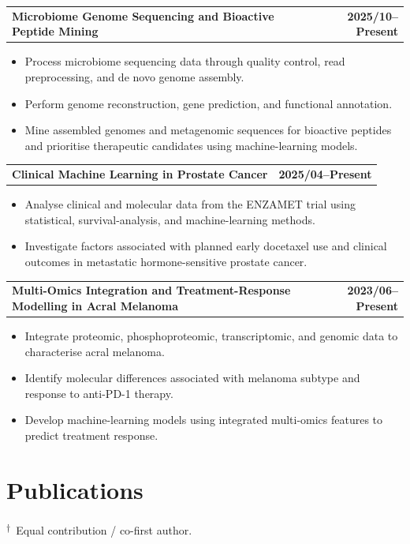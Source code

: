 \documentclass[10pt,a4paper]{article}
\makeatletter
\newcommand{\equalcontrib}{%
  \textsuperscript{\ensuremath{\dagger}}%
}
\newcommand{\projectentry}[2]{%
  \par\addvspace{2pt}%
  \noindent\begin{tabularx}{\textwidth}{@{}>{\raggedright\arraybackslash}X r@{}}
    \textbf{#1} & \textbf{#2}
  \end{tabularx}\par\vspace{-3pt}%
}
\makeatother
\begin{document}
\projectentry{Microbiome Genome Sequencing and Bioactive Peptide Mining}{2025/10--Present}
\begin{itemize}
  \item Process microbiome sequencing data through quality control, read preprocessing, and de novo genome assembly.
  \item Perform genome reconstruction, gene prediction, and functional annotation.
  \item Mine assembled genomes and metagenomic sequences for bioactive peptides and prioritise therapeutic candidates using machine-learning models.
\end{itemize}

\projectentry{Clinical Machine Learning in Prostate Cancer}{2025/04--Present}
\begin{itemize}
  \item Analyse clinical and molecular data from the ENZAMET trial using statistical, survival-analysis, and machine-learning methods.
  \item Investigate factors associated with planned early docetaxel use and clinical outcomes in metastatic hormone-sensitive prostate cancer.
\end{itemize}

\projectentry{Multi-Omics Integration and Treatment-Response Modelling in Acral Melanoma}{2023/06--Present}
\begin{itemize}
  \item Integrate proteomic, phosphoproteomic, transcriptomic, and genomic data to characterise acral melanoma.
  \item Identify molecular differences associated with melanoma subtype and response to anti-PD-1 therapy.
  \item Develop machine-learning models using integrated multi-omics features to predict treatment response.
\end{itemize}

\section{Publications}
{\small\equalcontrib\,Equal contribution / co-first author.}\par
\end{document}
